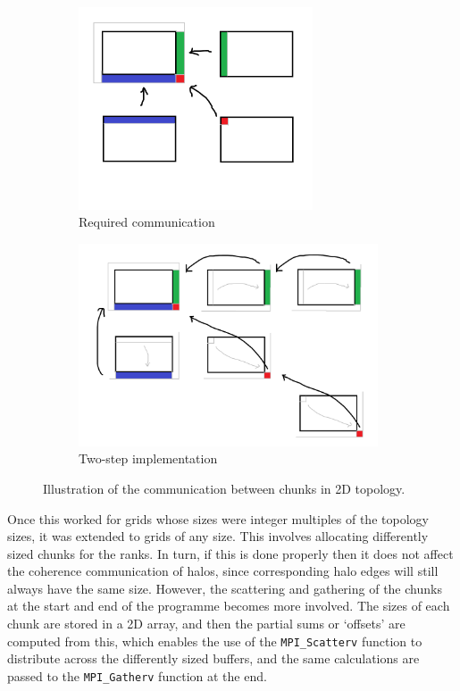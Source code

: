 \documentclass[12pt]{article}
\begin{document}
\begin{figure}[hp]
    \begin{subfigure}{0.49\textwidth}
    \includegraphics[width=0.9\linewidth, height=6cm, center]{figures/domain_decomp_2d_1.png}
    \caption{Required communication}
    \label{fig:domain_2d_1}
    \end{subfigure}
    \begin{subfigure}{0.49\textwidth}
    \includegraphics[width=0.9\linewidth, height=6cm, center]{figures/domain_decomp_2d_2.png}
    \caption{Two-step implementation}
    \label{fig:domain_2d_2}
    \end{subfigure}

    \caption{Illustration of the communication between chunks in 2D topology.}
    \label{fig:domain_2d}
\end{figure}

Once this worked for grids whose sizes were integer multiples of the topology sizes, it was extended to grids of any size.
This involves allocating differently sized chunks for the ranks.
In turn, if this is done properly then it does not affect the coherence communication of halos,
since corresponding halo edges will still always have the same size.
However, the scattering and gathering of the chunks at the start and end of the programme becomes more involved.
The sizes of each chunk are stored in a 2D array, and then the partial sums or `offsets' are computed from this,
which enables the use of the \texttt{MPI\_Scatterv} function to distribute across the differently sized buffers,
and the same calculations are passed to the \texttt{MPI\_Gatherv} function at the end.
\end{document}
